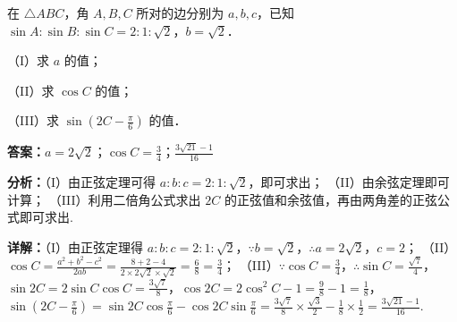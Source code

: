 \begin{question}[points=14]
在 $\triangle ABC$，角 $A, B, C$ 所对的边分别为 $a, b, c$，已知 $\sin A : \sin B : \sin C = 2 : 1 : \sqrt{2}$，$b = \sqrt{2}$．

（I）求 $a$ 的值；

（II）求 $\cos C$ 的值；

（III）求 $\sin\left(2C - \frac{\pi}{6}\right)$ 的值．
\begin{solution}
\textbf{答案：}$a=2\sqrt{2}$；$\cos C = \frac{3}{4}$；$\frac{3\sqrt{21}-1}{16}$

\textbf{分析：}（I）由正弦定理可得 $a:b:c = 2:1:\sqrt{2}$，即可求出；
（II）由余弦定理即可计算；
（III）利用二倍角公式求出 $2C$ 的正弦值和余弦值，再由两角差的正弦公式即可求出.

\textbf{详解：}（I）由正弦定理得 $a:b:c = 2:1:\sqrt{2}$，$\because b = \sqrt{2}$，$\therefore a = 2\sqrt{2}$，$c=2$；
（II）$\cos C = \frac{a^2+b^2-c^2}{2ab} = \frac{8+2-4}{2\times 2\sqrt{2}\times \sqrt{2}} = \frac{6}{8} = \frac{3}{4}$；
（III）$\because \cos C = \frac{3}{4}$，$\therefore \sin C = \frac{\sqrt{7}}{4}$，$\sin 2C = 2\sin C \cos C = \frac{3\sqrt{7}}{8}$，$\cos 2C = 2\cos^2 C -1 = \frac{9}{8}-1 = \frac{1}{8}$，$\sin\left(2C - \frac{\pi}{6}\right) = \sin 2C \cos \frac{\pi}{6} - \cos 2C \sin \frac{\pi}{6} = \frac{3\sqrt{7}}{8} \times \frac{\sqrt{3}}{2} - \frac{1}{8} \times \frac{1}{2} = \frac{3\sqrt{21} - 1}{16}$.
\end{solution}
\end{question}

